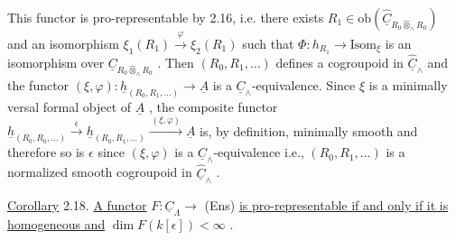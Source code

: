 \begin{center}
\end{center}
This functor is pro-representable by 2.16, i.e. there exists  $R_{1} \in \mathrm{ob}(\hat{\underline{C}}_{R_{0} \hat{\otimes}_{\wedge} R_{0}})$  and an isomorphism  $\xi_{1}(R_{1}) \xrightarrow{\ \varphi\ } \xi_{2}(R_{1})$  such that  $\Phi : h_{R_{1}} \to \mathrm{Isom}_{\xi}$  is an isomorphism over  $\underline{C}_{R_{0} \hat{\otimes}_{\wedge} R_{0}}$  . Then  $(R_{0},R_{1},\ldots)$  defines a cogroupoid in  $\hat{\underline{C}}_{\wedge}$  and the functor $(\xi,\varphi) : \underline{h}_{(R_{0},R_{1},\ldots)} \to \underline{A}$  is a  $\underline{C}_{\wedge}$-equivalence. Since  $\xi$  is a minimally versal formal object of  $\underline{A}$  , the composite functor  $\underline{h}_{(R_{0},R_{0},\ldots)} \xrightarrow{\ \epsilon\ } \underline{h}_{(R_{0},R_{1},\ldots)} \xrightarrow{\ (\xi,\varphi)\ } \underline{A}$ is, by definition, minimally smooth and therefore so is  $\epsilon$  since  $(\xi,\varphi)$  is a $\underline{C}_{\wedge}$-equivalence i.e.,  $(R_{0},R_{1},\ldots)$  is a normalized smooth cogroupoid in  $\hat{\underline{C}}_{\wedge}$  .



\underline{Corollary} 2.18.  \underline{A functor}  $F : \underline{C}_\Lambda \longrightarrow$ (Ens)  \underline{is pro-representable if and only if it is homogeneous and}  $\dim F(k[\epsilon]) < \infty$  .

